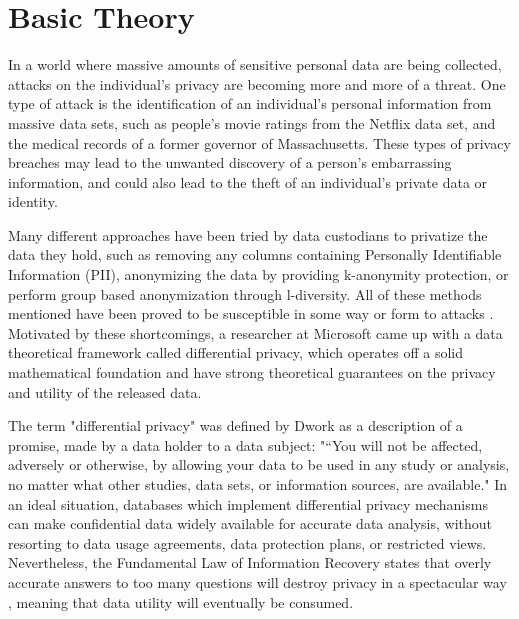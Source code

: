 
\chapter{Basic Theory}
In a world where massive amounts of sensitive personal data are being collected, attacks on the individual's privacy are becoming more and more of a threat. One type of attack is the identification of an individual's personal information from massive data sets, such as people's movie ratings from the Netflix data set\cite{narayanan2008robust}, and the medical records of a former governor of Massachusetts\cite{barth2012re}. These types of privacy breaches may lead to the unwanted discovery of a person's embarrassing information, and could also lead to the theft of an individual's private data or identity.  

Many different approaches have been tried by data custodians to privatize the data they hold, such as removing any columns containing Personally Identifiable Information (PII), anonymizing the data by providing k-anonymity protection\cite{sweeney2002k}, or perform group based anonymization through l-diversity\cite{machanavajjhala2007diversity}. All of these methods mentioned have been proved to be susceptible in some way or form to attacks \cite{ganta2008composition}. Motivated by these shortcomings, a researcher at Microsoft came up with a data theoretical framework called differential privacy, which operates off a solid mathematical foundation and have strong theoretical guarantees on the privacy and utility of the released data.

The term "differential privacy" was defined by Dwork as a description of a promise, made by a data holder to a data subject: "“You will not be affected, adversely or otherwise, by allowing your data to be used in any study or analysis, no matter what other studies, data sets, or information sources, are available." \cite{dwork2013algorithmic}
In an ideal situation, databases which implement differential privacy mechanisms can make confidential data widely available for accurate data analysis, without resorting to data usage agreements, data protection plans, or restricted views. Nevertheless, the Fundamental Law of Information Recovery states that overly accurate answers to too many questions will destroy privacy in a spectacular way \cite{dwork2013algorithmic}, meaning that data utility will eventually be consumed.


